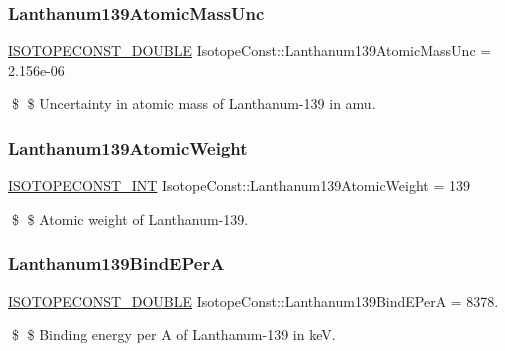 \subsubsection{\texorpdfstring{Lanthanum139\+Atomic\+Mass\+Unc}{Lanthanum139AtomicMassUnc}}
{\footnotesize\ttfamily \mbox{\hyperlink{group___isotope_const-_macros_ga8f45a7272ce02c0b4c65c44636ed719a}{I\+S\+O\+T\+O\+P\+E\+C\+O\+N\+S\+T\+\_\+\+D\+O\+U\+B\+LE}} Isotope\+Const\+::\+Lanthanum139\+Atomic\+Mass\+Unc = 2.\+156e-\/06}

\$ \$ Uncertainty in atomic mass of Lanthanum-\/139 in amu. \mbox{\label{group___isotope_const-_lanthanum-_la139_ga04d2f9ea6c0ada4bba510fa69957f4b9}} 
\subsubsection{\texorpdfstring{Lanthanum139\+Atomic\+Weight}{Lanthanum139AtomicWeight}}
{\footnotesize\ttfamily \mbox{\hyperlink{group___isotope_const-_macros_ga5f18360b3e99483a35c32d789e62621c}{I\+S\+O\+T\+O\+P\+E\+C\+O\+N\+S\+T\+\_\+\+I\+NT}} Isotope\+Const\+::\+Lanthanum139\+Atomic\+Weight = 139}

\$ \$ Atomic weight of Lanthanum-\/139. \mbox{\label{group___isotope_const-_lanthanum-_la139_ga14af8393fe3b2a57e3b70d61f5fc95e7}} 
\subsubsection{\texorpdfstring{Lanthanum139\+Bind\+E\+PerA}{Lanthanum139BindEPerA}}
{\footnotesize\ttfamily \mbox{\hyperlink{group___isotope_const-_macros_ga8f45a7272ce02c0b4c65c44636ed719a}{I\+S\+O\+T\+O\+P\+E\+C\+O\+N\+S\+T\+\_\+\+D\+O\+U\+B\+LE}} Isotope\+Const\+::\+Lanthanum139\+Bind\+E\+PerA = 8378.}

\$ \$ Binding energy per A of Lanthanum-\/139 in keV. \mbox{\label{group___isotope_const-_lanthanum-_la139_ga47d7f6dcc849d7ef64525c96476e54f1}} 
